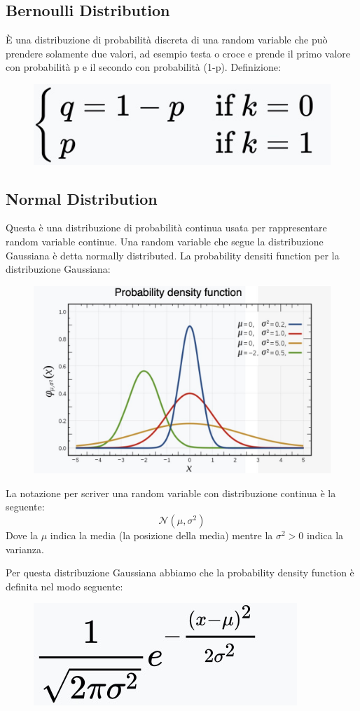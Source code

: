 \documentclass[14pt]{extreport}
\begin{document}
\subsection{Bernoulli Distribution}

È una distribuzione di probabilità discreta di una random variable che può prendere solamente due valori, ad esempio testa o croce e prende il primo
valore con probabilità p e il secondo con probabilità (1-p). Definizione:

\begin{figure}[H]
\centering
\includegraphics[width=0.3\linewidth]{95.jpeg}
\end{figure}

\subsection{Normal Distribution}

Questa è una distribuzione di probabilità continua usata per rappresentare random variable continue. Una random variable che segue la distribuzione
Gaussiana è detta normally distributed. La probability densiti function per la distribuzione Gaussiana:

\begin{figure}[H]
\centering
\includegraphics[width=0.5\linewidth]{96.jpeg}
\end{figure}

La notazione per scriver una random variable con distribuzione continua è la seguente: $$\mathcal{N}(\mu, \sigma^2)$$ Dove la $\mu$ indica la media
(la posizione della media) mentre la $\sigma^2>0$ indica la varianza.

Per questa distribuzione Gaussiana abbiamo che la probability density function è definita nel modo seguente:

\begin{figure}[H]
\centering
\includegraphics[width=0.3\linewidth]{97.jpeg}
\end{figure} 
\end{document}
